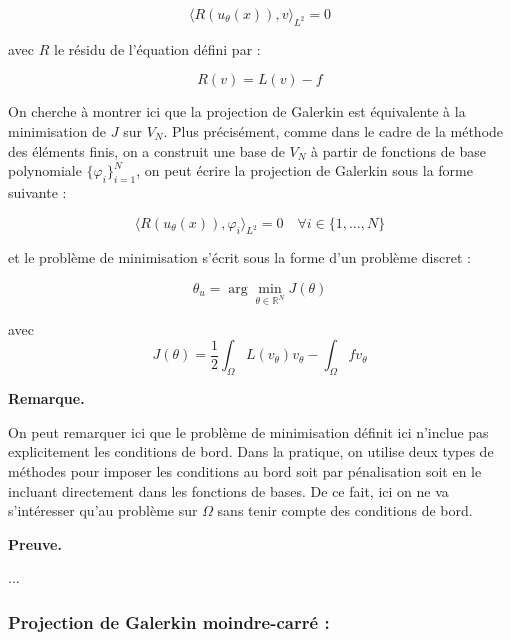 \documentclass[french]{article}
\newenvironment{preuve}[1][]{\begin{tcolorbox}[
	colback=white, %
	colframe=green!70!black, %
	arc=2mm, %
	boxrule=1pt, %
	breakable, enhanced jigsaw
	]
	\textcolor{green!70!black}{\textbf{Preuve.} \\}

	#1
}{\end{tcolorbox}}
\newenvironment{remarque}[1][]{\begin{tcolorbox}[
	colback=white, %
	arc=2mm, %
	borderline={0.5mm}{0mm}{black!15!white},
	borderline={0.5mm}{0mm}{black!50!white,dashed},
	breakable, enhanced jigsaw
	]
	\textcolor{black!70!black}{\textbf{Remarque.}} #1
}{\end{tcolorbox}}
\begin{document}
\begin{itemize}[label=]
		\begin{equation*}
			\langle R(u_\theta(x)), v\rangle_{L^2} = 0
		\end{equation*}
		
		avec $R$ le résidu de l'équation défini par :
		
		\begin{equation*}
			R(v) = L(v) - f
		\end{equation*}
		
		On cherche à montrer ici que la projection de Galerkin est équivalente à la minimisation de $J$ sur $V_N$. Plus précisément, comme dans le cadre de la méthode des éléments finis, on a construit une base de $V_N$ à partir de fonctions de base polynomiale $\{\varphi_i\}_{i=1}^N$, on peut écrire la projection de Galerkin sous la forme suivante :

		\begin{equation*}
			\langle R(u_\theta(x)), \varphi_i\rangle_{L^2} = 0 \quad \forall i \in \{1,\dots,N\}
		\end{equation*}

		et le problème de minimisation s'écrit sous la forme d'un problème discret :
		
		\begin{equation}
			\theta_u = \arg\min_{\theta \in \mathbb{R}^N}J(\theta) \label{min_galerkin_discret}
		\end{equation}
		
		avec
		\begin{equation*}
			J(\theta)=\frac{1}{2}\int_\Omega L(v_\theta)v_\theta - \int_\Omega fv_\theta
		\end{equation*}
	
		\begin{remarque}
			On peut remarquer ici que le problème de minimisation définit ici n'inclue pas explicitement les conditions de bord. Dans la pratique, on utilise deux types de méthodes pour imposer les conditions au bord soit par pénalisation soit en le incluant directement dans les fonctions de bases. De ce fait, ici on ne va s'intéresser qu'au problème sur $\Omega$ sans tenir compte des conditions de bord.
		\end{remarque}
	
		\begin{preuve}			
...
		\end{preuve}
	\end{itemize}		
	
	\subsubsection{Projection de Galerkin moindre-carré :}
	
\end{document}
